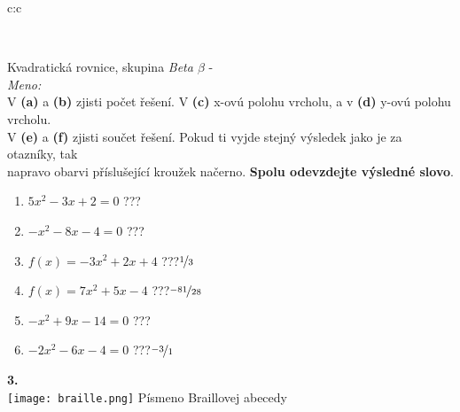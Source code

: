 \documentclass[10pt]{report}
\begin{document}
\begin{tabular}{c:c}
\begin{minipage}[c][99mm][t]{0.49\linewidth}
\begin{center}
\begin{minipage}{0.20\linewidth}
\end{minipage}
\end{center}
\end{minipage}
\\ \hdashline
\begin{minipage}[c][99mm][t]{0.49\linewidth}
\begin{center}
\vspace{7mm}
{\huge Kvadratická rovnice, skupina \textit{Beta $\beta$} -}\\[4.5mm]
\textit{Meno:}\phantom{xxxxxxxxxxxxxxxxxxxxxxxxxxxxxxxxxxxxxxxxxxxxxxxxxxxxxxxxxxxxxxxxx}\\[3.5mm]
V \textbf{(a)} a \textbf{(b)} zjisti počet řešení. V \textbf{(c)} x-ovú polohu vrcholu, a v \textbf{(d)} y-ovú polohu vrcholu.\\V \textbf{(e)} a \textbf{(f)} zjisti součet řešení. Pokud ti vyjde stejný výsledek jako je za otazníky, tak\\napravo obarvi příslušející kroužek načerno. \textbf{Spolu odevzdejte výsledné slovo}.\\[3mm]
\begin{minipage}{0.77\linewidth}
\begin{center}
\begin{varwidth}{\textwidth}
\begin{enumerate}
\large
\item $5x^2-3x+2=0$\quad \dotfill\; ???\;\dotfill {}
\item $-x^2-8x-4=0$\quad \dotfill\; ???\;\dotfill {}
\item $f(x)=-3x^2+2x+4$\quad \dotfill\; ???\;\dotfill \quad $\nicefrac{1}{3}$
\item $f(x)=7x^2+5x-4$\quad \dotfill\; ???\;\dotfill \quad $\nicefrac{-81}{28}$
\item $-x^2+9x-14=0$\quad \dotfill\; ???\;\dotfill {}
\item $-2x^2-6x-4=0$\quad \dotfill\; ???\;\dotfill \quad $\nicefrac{-3}{1}$
\end{enumerate}
\end{varwidth}
\end{center}
\end{minipage}
\begin{minipage}{0.20\linewidth}
\begin{center}
{\Huge\bfseries 3.} \\[2mm]
\texttt{[image: braille.png]}
{\small Písmeno Braillovej abecedy}
\end{center}
\end{minipage}

\end{center}
\end{minipage}
\end{tabular}
\end{document}
